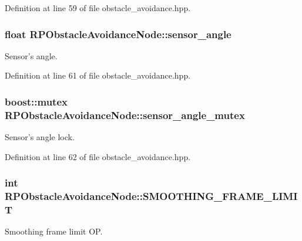 \-Definition at line 59 of file obstacle\-\_\-avoidance.\-hpp.

\hypertarget{class_r_p_obstacle_avoidance_node_a127cdfd4cd666862eababa52877a6a30}{
\subsubsection[{sensor\-\_\-angle}]{\setlength{\rightskip}{0pt plus 5cm}float {\bf \-R\-P\-Obstacle\-Avoidance\-Node\-::sensor\-\_\-angle}}}\label{class_r_p_obstacle_avoidance_node_a127cdfd4cd666862eababa52877a6a30}
\-Sensor's angle. 

\-Definition at line 61 of file obstacle\-\_\-avoidance.\-hpp.

\hypertarget{class_r_p_obstacle_avoidance_node_a230a3dab379f4a70f38b45763f5e48bb}{
\subsubsection[{sensor\-\_\-angle\-\_\-mutex}]{\setlength{\rightskip}{0pt plus 5cm}boost\-::mutex {\bf \-R\-P\-Obstacle\-Avoidance\-Node\-::sensor\-\_\-angle\-\_\-mutex}}}\label{class_r_p_obstacle_avoidance_node_a230a3dab379f4a70f38b45763f5e48bb}
\-Sensor's angle lock. 

\-Definition at line 62 of file obstacle\-\_\-avoidance.\-hpp.

\hypertarget{class_r_p_obstacle_avoidance_node_aa8ba56ebe9cb6ad7865458a3be287b70}{
\subsubsection[{\-S\-M\-O\-O\-T\-H\-I\-N\-G\-\_\-\-F\-R\-A\-M\-E\-\_\-\-L\-I\-M\-I\-T}]{\setlength{\rightskip}{0pt plus 5cm}int {\bf \-R\-P\-Obstacle\-Avoidance\-Node\-::\-S\-M\-O\-O\-T\-H\-I\-N\-G\-\_\-\-F\-R\-A\-M\-E\-\_\-\-L\-I\-M\-I\-T}}}\label{class_r_p_obstacle_avoidance_node_aa8ba56ebe9cb6ad7865458a3be287b70}
\-Smoothing frame limit \-O\-P. 

